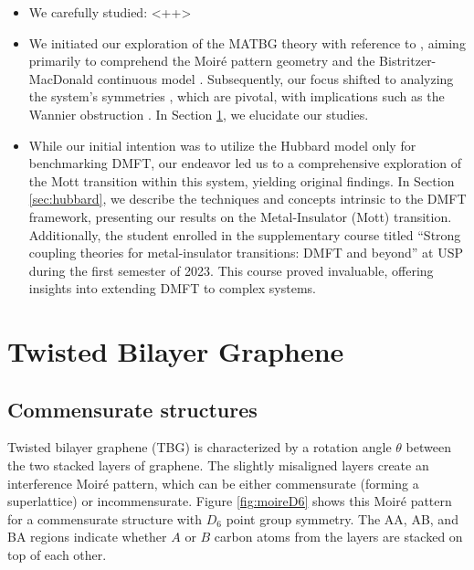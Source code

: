 \documentclass[12pt]{report}
\begin{document}
\begin{itemize}
\item We carefully studied: <++>

\item We initiated our exploration of the MATBG theory with reference to \cite{handbook2019}, aiming primarily to comprehend the Moiré pattern geometry and the Bistritzer-MacDonald continuous model \cite{macdonald2011}. Subsequently, our focus shifted to analyzing the system's symmetries \cite{thesis_rennella}, which are pivotal, with implications such as the Wannier obstruction \cite{zou2018}. In Section \ref{sec:tbg}, we elucidate our studies.

\item While our initial intention was to utilize the Hubbard model only for benchmarking DMFT, our endeavor led us to a comprehensive exploration of the Mott transition within this system, yielding original findings. In Section \ref{sec:hubbard}, we describe the techniques and concepts intrinsic to the DMFT framework, presenting our results on the Metal-Insulator (Mott) transition. Additionally, the student enrolled in the supplementary course titled ``Strong coupling theories for metal-insulator transitions: DMFT and beyond'' at USP during the first semester of 2023. This course proved invaluable, offering insights into extending DMFT to complex systems.
\end{itemize}


\section{Twisted Bilayer Graphene} \label{sec:tbg}

\subsection{Commensurate structures} \label{sec:tbg_geom}

Twisted bilayer graphene (TBG) is characterized by a rotation angle $\theta$ between the two stacked layers of graphene. The slightly misaligned layers create an interference Moiré pattern, which can be either commensurate (forming a superlattice) or incommensurate. Figure \ref{fig:moireD6} shows this Moiré pattern for a commensurate structure with $D_6$ point group symmetry. The AA, AB, and BA regions indicate whether $A$ or $B$ carbon atoms from the layers are stacked on top of each other.
\end{document}
